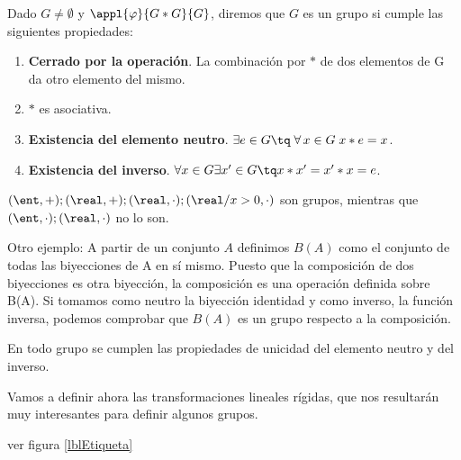 \documentclass[nochap]{apuntes}
\begin{document}
\begin{defn}[Grupo]
Dado $G\neq \emptyset$  y $\appl{\varphi}{G\ast G}{G}$, diremos que $G$ es un grupo si cumple las siguientes propiedades:
\begin{enumerate}
\item \textbf{Cerrado por la operación}. La combinación por $\ast$  de dos elementos de G da otro elemento del mismo. 
\item $\ast$ es asociativa.
\item \textbf{Existencia del elemento neutro}. $\exists  e \in G \tq \; \forall\, x\in G\; x\ast e=x$.
\item \textbf{Existencia del inverso}. $\forall x \in G \exists x' \in G \tq x\ast x'=x'\ast x=e$.
\end{enumerate}
\end{defn}

\begin{example}
  $ (\ent, +); (\real, +); (\real, \cdot); (\real/x>0, \cdot)$ son grupos, mientras que 
  $(\ent, \cdot); (\real, \cdot)$ no lo son.
  
  Otro ejemplo: A partir de un conjunto $A$ definimos $B(A)$ como el conjunto de todas las biyecciones de A en sí mismo.  Puesto que la composición de dos biyecciones es otra biyección, la composición es una operación definida sobre B(A). Si tomamos como neutro la biyección identidad y como inverso, la función inversa, podemos comprobar que $B(A)$ es un grupo respecto a la composición.
\end{example}

\begin{theorem}
  En todo grupo se cumplen las propiedades de unicidad del elemento neutro y del inverso.
\end{theorem}


Vamos a definir ahora las transformaciones lineales rígidas, que nos resultarán muy interesantes para definir algunos grupos.

\begin{problem}






\solution
{}
ver figura \ref{lblEtiqueta}

\end{problem}


\newpage
\printindex
\end{document}
